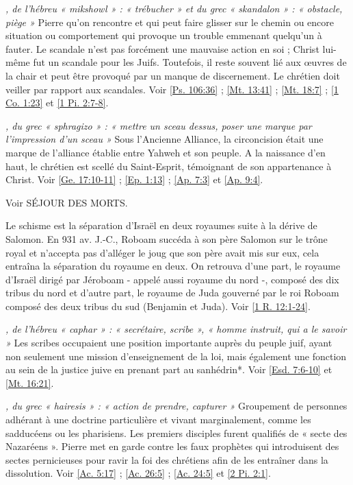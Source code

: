 \begin{multicols}{2}
\textit{, de l'hébreu « mikshowl » : « trébucher » et du grec « skandalon » : « obstacle, piège »}\newline
Pierre qu'on rencontre et qui peut faire glisser sur le chemin ou encore situation ou comportement qui provoque un trouble emmenant quelqu'un à fauter. Le scandale n'est pas forcément une mauvaise action en soi ; Christ lui-même fut un scandale pour les Juifs. Toutefois, il reste souvent lié aux œuvres de la chair et peut être provoqué par un manque de discernement. Le chrétien doit veiller par rapport aux scandales. Voir \vref{Ps. 106:36} ; \vref{Mt. 13:41} ; \vref{Mt. 18:7} ; \vref{1 Co. 1:23} et \vref{1 Pi. 2:7-8}.

\textit{, du grec « sphragizo » : « mettre un sceau dessus, poser une marque par l'impression d'un sceau »}\newline
Sous l'Ancienne Alliance, la circoncision était une marque de l'alliance établie entre Yahweh et son peuple. A la naissance d'en haut, le chrétien est scellé du Saint-Esprit, témoignant de son appartenance à Christ. Voir \vref{Ge. 17:10-11} ; \vref{Ep. 1:13} ; \vref{Ap. 7:3} et \vref{Ap. 9:4}.

\textit{}\newline
Voir SÉJOUR DES MORTS.

\textit{}\newline
Le schisme est la séparation d'Israël en deux royaumes suite à la dérive de Salomon. En 931 av. J.-C., Roboam succéda à son père Salomon sur le trône royal et n'accepta pas d'alléger le joug que son père avait mis sur eux, cela entraîna la séparation du royaume en deux. On retrouva d'une part, le royaume d'Israël dirigé par Jéroboam - appelé aussi royaume du nord -, composé des dix tribus du nord et d'autre part, le royaume de Juda gouverné par le roi Roboam composé des deux tribus du sud (Benjamin et Juda). Voir \vref{1 R. 12:1-24}.

\textit{, de l'hébreu « caphar » : « secrétaire, scribe », « homme instruit, qui a le savoir »}\newline
Les scribes occupaient une position importante auprès du peuple juif, ayant non seulement une mission d'enseignement de la loi, mais également une fonction au sein de la justice juive en prenant part au sanhédrin*. Voir \vref{Esd. 7:6-10} et \vref{Mt. 16:21}.

\textit{, du grec « hairesis » : « action de prendre, capturer »}\newline
Groupement de personnes adhérant à une doctrine particulière et vivant marginalement, comme les sadducéens ou les pharisiens. Les premiers disciples furent qualifiés de « secte des Nazaréens ». Pierre met en garde contre les faux prophètes qui introduisent des sectes pernicieuses pour ravir la foi des chrétiens afin de les entraîner dans la dissolution. Voir \vref{Ac. 5:17} ; \vref{Ac. 26:5} ; \vref{Ac. 24:5} et \vref{2 Pi. 2:1}.


\end{multicols}
